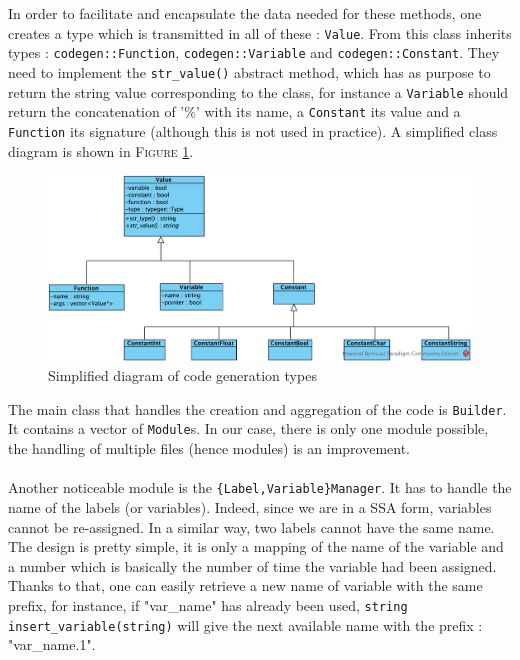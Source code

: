 \documentclass[a4paper,11pt]{article}
\begin{document}
In order to facilitate and encapsulate the data needed for these methods, one creates a type which is transmitted in all of these : \texttt{Value}. From this class inherits types : \texttt{codegen::Function}, \texttt{codegen::Variable} and \texttt{codegen::Constant}. They need to implement the \texttt{str\_value()} abstract method, which has as purpose to return the string value corresponding to the class, for instance a \texttt{Variable} should return the concatenation of '\%' with its name, a \texttt{Constant} its value and a \texttt{Function} its signature (although this is not used in practice). A simplified class diagram is shown in \textsc{Figure} \ref{codegen:value}.

\begin{figure}[h]
	\centering
	\includegraphics[scale=0.8]{Value.png}
	\caption{Simplified diagram of code generation types}
	\label{codegen:value}
\end{figure}

The main class that handles the creation and aggregation of the code is \texttt{Builder}. It contains a vector of \texttt{Module}s. In our case, there is only one module possible, the handling of multiple files (hence modules) is an improvement.

\paragraph{}

Another noticeable module is the \texttt{\{Label,Variable\}Manager}. It has to handle the name of the labels (or variables). Indeed, since we are in a SSA form, variables cannot be re-assigned. In a similar way, two labels cannot have the same name. The design is pretty simple, it is only a mapping of the name of the variable and a number which is basically the number of time the variable had been assigned. Thanks to that, one can easily retrieve a new name of variable with the same prefix, for instance, if "var\_name" has already been used, \texttt{string insert\_variable(string)} will give the next available name with the prefix : "var\_name.1".
\end{document}

